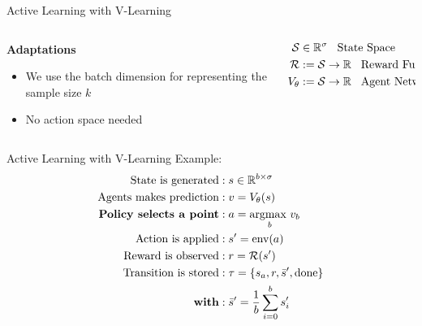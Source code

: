 \documentclass[aspectratio=169, 11pt, invertlogo]{ismll-slides}
\begin{document}
\begin{frame}[fragile]{Active Learning with V-Learning}
	\begin{columns}
		\begin{column}{.4\linewidth}
			\textbf{Adaptations}
			\begin{itemize}
				\item We use the batch dimension for representing the sample size $k$
				\item No action space needed
				
			\end{itemize}
		\end{column}
		\begin{column}{.4\linewidth}
			\begin{align*}
			\mathcal{S} &\in \mathbb{R}^{\sigma} \hspace{3mm}\text{State Space} \\
			\mathcal{R} &:= \mathcal{S} \rightarrow \mathbb{R} \hspace{3mm}\text{Reward Function} \\
			V_\theta &:= \mathcal{S} \rightarrow \mathbb{R} \hspace{3mm}\text{Agent Network} \\
			\end{align*}
		\end{column}
	\end{columns}
\end{frame}



\begin{frame}[fragile]{Active Learning with V-Learning}
	Example:
	\begin{align*}
		\text{State is generated} &: s \in \mathbb{R}^{b \times \sigma} \\
		\text{Agents makes prediction} &: v = V_\theta(s) \\
		\text{\textbf{Policy selects a point}} &: a = \underset{b}{\text{argmax }} v_{b} \\
		\text{Action is applied} &: s' = \text{env}(a) \\
		\text{Reward is observed} &: r = \mathcal{R}(s') \\
		\text{Transition is stored} &: \tau = \{ s_{a}, r, \bar s', \text{done} \} \\
		\text{\textbf{with}} &: \bar s' = \frac{1}{b} \sum\limits_{i=0}^b s'_{i}
	\end{align*}
\end{frame}
\end{document}
